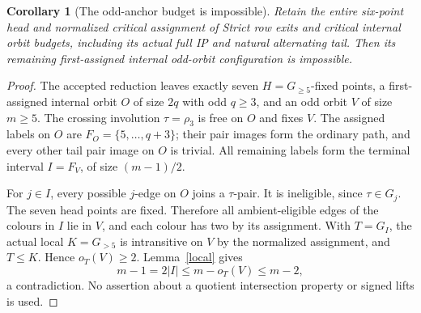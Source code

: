 \documentclass[11pt,a4paper]{article}
\newtheorem{corollary}[lemma]{Corollary}
\begin{document}
\begin{corollary}[The odd-anchor budget is impossible]\label{anchor}
Retain the entire six-point head and normalized critical assignment
of \emph{Strict row exits and critical internal orbit budgets},
including its actual full IP and natural alternating tail.
Then its remaining first-assigned internal odd-orbit configuration
is impossible.
\end{corollary}
\begin{proof}
The accepted reduction leaves exactly seven $H=G_{\ge5}$-fixed
points, a first-assigned internal orbit $O$ of size $2q$ with odd
$q\ge3$, and an odd orbit $V$ of size $m\ge5$. The crossing
involution $\tau=\rho_3$ is free on $O$ and fixes $V$.
The assigned labels on $O$ are $F_O=\{5,\ldots,q+3\}$;
their pair images form the ordinary path, and every other tail
pair image on $O$ is trivial. All remaining labels form the
terminal interval $I=F_V$, of size $(m-1)/2$.

For $j\in I$, every possible $j$-edge on $O$ joins a
$\tau$-pair. It is ineligible, since $\tau\in G_j$.
The seven head points are fixed. Therefore all ambient-eligible
edges of the colours in $I$ lie in $V$, and each colour has two
by its assignment. With $T=G_I$, the actual local
$K=G_{>5}$ is intransitive on $V$ by the normalized assignment,
and $T\le K$. Hence $o_T(V)\ge2$. Lemma~\ref{local} gives
\[
                     m-1=2|I|\le m-o_T(V)\le m-2,
\]
a contradiction. No assertion about a quotient intersection
property or signed lifts is used.
\end{proof}
\end{document}
